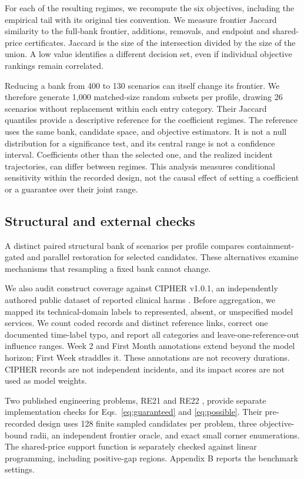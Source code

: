 \documentclass[conference,compsoc]{IEEEtran}
\begin{document}
For each of the resulting \CoefficientRegimes{} regimes, we recompute the
six objectives, including the empirical tail with its original ties convention.
We measure frontier Jaccard similarity to the full-bank frontier, additions,
removals, and endpoint and shared-price certificates. Jaccard is the size of
the intersection divided by the size of the union. A low value identifies a
different decision set, even if individual objective rankings remain correlated.

Reducing a bank from 400 to 130 scenarios can itself change its frontier.
We therefore generate 1,000 matched-size random subsets per profile, drawing
26 scenarios without replacement within each entry category. Their Jaccard
quantiles provide a descriptive reference for the coefficient regimes.
The reference uses the same bank, candidate space, and objective estimators.
It is not a null distribution for a significance test, and its central range
is not a confidence interval. Coefficients other than the selected one, and
the realized incident trajectories, can differ between regimes. This analysis
measures conditional sensitivity within the recorded design, not the causal
effect of setting a coefficient or a guarantee over their joint range.

\subsection{Structural and external checks}
A distinct paired structural bank
of \StructuralTrials{} scenarios per profile compares containment-gated
and parallel restoration for \StructuralCandidates{} selected candidates.
These alternatives examine mechanisms that resampling a fixed bank cannot
change.

We also audit construct coverage against CIPHER v1.0.1, an independently
authored public dataset of reported clinical harms \cite{cipher2025}.
Before aggregation, we mapped its technical-domain labels to represented,
absent, or unspecified model services. We count coded records and distinct
reference links, correct one documented time-label typo, and report all
categories and leave-one-reference-out influence ranges. Week 2 and First
Month annotations extend beyond the model horizon; First Week straddles it.
These annotations are not recovery durations. CIPHER records are not
independent incidents, and its impact scores are not used as model weights.

Two published engineering problems, RE21 and RE22 \cite{tanabe2020},
provide separate implementation checks for Eqs.~\ref{eq:guaranteed}
and \ref{eq:possible}. Their pre-recorded design uses 128 finite sampled
candidates per problem, three objective-bound radii, an independent frontier
oracle, and exact small corner enumerations. The shared-price support
function is separately checked against linear programming, including
positive-gap regions. Appendix B reports the benchmark settings.
\end{document}
